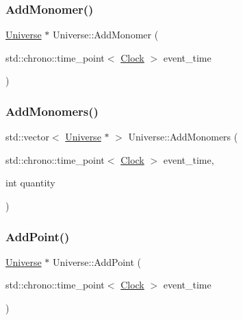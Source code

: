 \mbox{\label{classUniverse_a062a9472f0400e566ecc7dc056d989d9}} 
\subsubsection{\texorpdfstring{Add\+Monomer()}{AddMonomer()}}
{\footnotesize\ttfamily \mbox{\hyperlink{classUniverse}{Universe}} $\ast$ Universe\+::\+Add\+Monomer (\begin{DoxyParamCaption}\item[{std\+::chrono\+::time\+\_\+point$<$ \mbox{\hyperlink{universe_8h_a0ef8d951d1ca5ab3cfaf7ab4c7a6fd80}{Clock}} $>$}]{event\+\_\+time }\end{DoxyParamCaption})}

\mbox{\label{classUniverse_a95fe7f99971bb2048121a7c4e87b9f79}} 
\subsubsection{\texorpdfstring{Add\+Monomers()}{AddMonomers()}}
{\footnotesize\ttfamily std\+::vector$<$ \mbox{\hyperlink{classUniverse}{Universe}} $\ast$ $>$ Universe\+::\+Add\+Monomers (\begin{DoxyParamCaption}\item[{std\+::chrono\+::time\+\_\+point$<$ \mbox{\hyperlink{universe_8h_a0ef8d951d1ca5ab3cfaf7ab4c7a6fd80}{Clock}} $>$}]{event\+\_\+time,  }\item[{int}]{quantity }\end{DoxyParamCaption})}

\mbox{\label{classUniverse_a8508b791c6997d8abcdcc037a6776734}} 
\subsubsection{\texorpdfstring{Add\+Point()}{AddPoint()}}
{\footnotesize\ttfamily \mbox{\hyperlink{classUniverse}{Universe}} $\ast$ Universe\+::\+Add\+Point (\begin{DoxyParamCaption}\item[{std\+::chrono\+::time\+\_\+point$<$ \mbox{\hyperlink{universe_8h_a0ef8d951d1ca5ab3cfaf7ab4c7a6fd80}{Clock}} $>$}]{event\+\_\+time }\end{DoxyParamCaption})}

